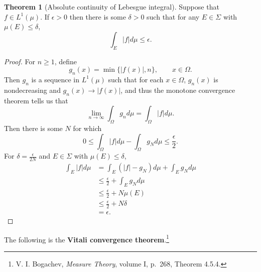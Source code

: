 \documentclass{article}
\theoremstyle{definition}
\newtheorem{theorem}{Theorem}
\theoremstyle{definition}
\begin{document}
\begin{theorem}[Absolute continuity of Lebesgue integral]
Suppose that $f \in L^1(\mu)$. If $\epsilon>0$ then there is some $\delta>0$ such that for any
$E \in \Sigma$ with $\mu(E) \leq \delta$,
\[
\int_E |f| d\mu \leq \epsilon.
\]
\label{absolutecontinuity}
\end{theorem}
\begin{proof}
For $n \geq 1$, define
\[
g_n(x) = \min\{|f(x)|,n\}, \qquad x \in \Omega.
\]
Then $g_n$ is a sequence in $L^1(\mu)$ such that for each $x \in \Omega$,
$g_n(x)$ is nondecreasing and $g_n(x) \to |f(x)|$, and thus the monotone convergence theorem
tells us that 
\[
\lim_{n \to \infty} \int_\Omega g_n d\mu = \int_\Omega |f| d\mu.
\]
Then there is some $N$ for which
\[
0 \leq \int_\Omega |f| d\mu - \int_\Omega g_N d\mu \leq \frac{\epsilon}{2}.
\]
For $\delta=\frac{\epsilon}{2N}$ and $E \in \Sigma$ with $\mu(E) \leq \delta$,
\begin{align*}
\int_E |f| d\mu&=\int_E (|f|-g_N) d\mu + \int_E g_N d\mu\\
&\leq \frac{\epsilon}{2}+\int_E g_N d\mu\\
&\leq \frac{\epsilon}{2}+N \mu(E)\\
&\leq \frac{\epsilon}{2}+N\delta\\
&=\epsilon.
\end{align*}
\end{proof}


The following is the \textbf{Vitali convergence theorem}.\footnote{V. I. Bogachev, {\em Measure Theory}, volume I,
p.~268, Theorem 4.5.4.}
\end{document}
